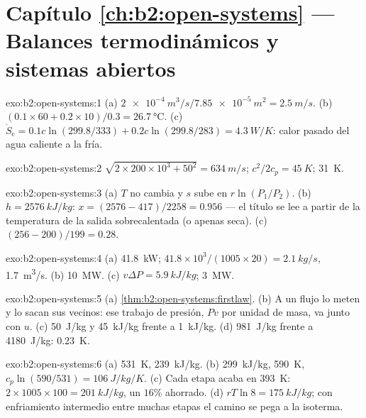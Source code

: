 \section*{Capítulo \ref{ch:b2:open-systems} --- Balances termodinámicos y sistemas abiertos}

\begin{solution}{exo:b2:open-systems:1}
(a) $\qty{2e-4}{m^3/s}/\qty{7.85e-5}{m^2} = \qty{2.5}{m/s}$. (b) $(0.1 \times 60 + 0.2
\times 10)/0.3 = \qty{26.7}{\celsius}$. (c) $\dot S_{\text{c}} = 0.1c\ln(299.8/333) +
0.2c\ln(299.8/283) = \qty{4.3}{W/K}$: calor pasado del agua caliente a la fría.
\end{solution}

\begin{solution}{exo:b2:open-systems:2}
$\sqrt{2 \times 200 \times 10^3 + 50^2} = \qty{634}{m/s}$; $c^2/2c_p = \qty{45}{K}$;
\qty{31}{K}.
\end{solution}

\begin{solution}{exo:b2:open-systems:3}
(a) $T$ no cambia y $s$ sube en $r\ln(P_1/P_2)$. (b) $h = \qty{2576}{kJ/kg}$:
$x = (2576 - 417)/2258 = 0.956$ --- el título se lee a partir de la
temperatura de la salida sobrecalentada (o apenas seca). (c) $(256 -
200)/199 = 0.28$.
\end{solution}

\begin{solution}{exo:b2:open-systems:4}
(a) \qty{41.8}{kW}; $41.8 \times 10^3/(1005 \times 20) = \qty{2.1}{kg/s}$, \qty{1.7}{m^3/s}.
(b) \qty{10}{MW}. (c) $v\Delta P = \qty{5.9}{kJ/kg}$; \qty{3}{MW}.
\end{solution}

\begin{solution}{exo:b2:open-systems:5}
(a) \cref{thm:b2:open-systems:firstlaw}. (b) A un flujo lo meten y lo
sacan sus vecinos: ese trabajo de presión, $Pv$ por unidad de masa, va
junto con $u$. (c) \qty{50}{J/kg} y \qty{45}{kJ/kg} frente a \qty{1}{kJ/kg}.
(d) \qty{981}{J/kg} frente a \qty{4180}{J/kg}: \qty{0.23}{K}.
\end{solution}

\begin{solution}{exo:b2:open-systems:6}
(a) \qty{531}{K}, \qty{239}{kJ/kg}. (b) \qty{299}{kJ/kg}, \qty{590}{K}, $c_p\ln(590/531)
= \qty{106}{J/kg/K}$. (c) Cada etapa acaba en \qty{393}{K}: $2 \times 1005 \times 100 =
\qty{201}{kJ/kg}$, un $16\%$ ahorrado. (d) $rT\ln 8 = \qty{175}{kJ/kg}$; con
enfriamiento intermedio entre muchas etapas el camino se pega a la isoterma.
\end{solution}

